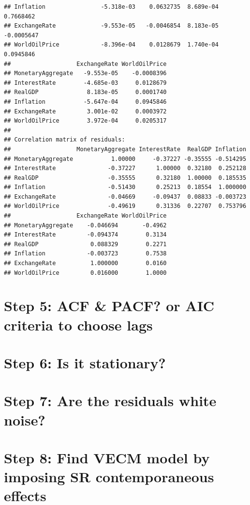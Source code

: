 \documentclass[11pt,preprint, authoryear]{elsarticle}
\numberwithin{equation}{section}
\numberwithin{figure}{section}
\numberwithin{table}{section}
\begin{document}
\begin{verbatim}
## Inflation                -5.318e-03    0.0632735  8.689e-04  0.7668462
## ExchangeRate             -9.553e-05   -0.0046854  8.183e-05 -0.0005647
## WorldOilPrice            -8.396e-04    0.0128679  1.740e-04  0.0945846
##                   ExchangeRate WorldOilPrice
## MonetaryAggregate   -9.553e-05    -0.0008396
## InterestRate        -4.685e-03     0.0128679
## RealGDP              8.183e-05     0.0001740
## Inflation           -5.647e-04     0.0945846
## ExchangeRate         3.001e-02     0.0003972
## WorldOilPrice        3.972e-04     0.0205317
## 
## Correlation matrix of residuals:
##                   MonetaryAggregate InterestRate  RealGDP Inflation
## MonetaryAggregate           1.00000     -0.37227 -0.35555 -0.514295
## InterestRate               -0.37227      1.00000  0.32180  0.252128
## RealGDP                    -0.35555      0.32180  1.00000  0.185535
## Inflation                  -0.51430      0.25213  0.18554  1.000000
## ExchangeRate               -0.04669     -0.09437  0.08833 -0.003723
## WorldOilPrice              -0.49619      0.31336  0.22707  0.753796
##                   ExchangeRate WorldOilPrice
## MonetaryAggregate    -0.046694       -0.4962
## InterestRate         -0.094374        0.3134
## RealGDP               0.088329        0.2271
## Inflation            -0.003723        0.7538
## ExchangeRate          1.000000        0.0160
## WorldOilPrice         0.016000        1.0000
\end{verbatim}

\hypertarget{step-5-acf-pacf-or-aic-criteria-to-choose-lags}{%
\section{Step 5: ACF \& PACF? or AIC criteria to choose
lags}\label{step-5-acf-pacf-or-aic-criteria-to-choose-lags}}

\hypertarget{step-6-is-it-stationary}{%
\section{Step 6: Is it stationary?}\label{step-6-is-it-stationary}}

\hypertarget{step-7-are-the-residuals-white-noise}{%
\section{Step 7: Are the residuals white
noise?}\label{step-7-are-the-residuals-white-noise}}

\hypertarget{step-8-find-vecm-model-by-imposing-sr-contemporaneous-effects}{%
\section{Step 8: Find VECM model by imposing SR contemporaneous
effects}\label{step-8-find-vecm-model-by-imposing-sr-contemporaneous-effects}}
\end{document}
